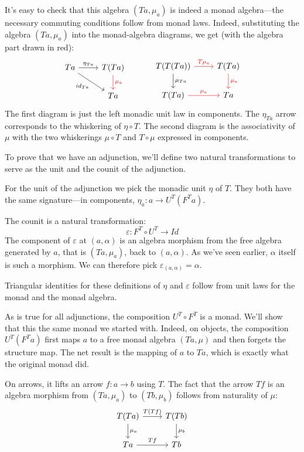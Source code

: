 \documentclass[DaoFP]{subfiles}
\begin{document}
It's easy to check that this algebra $(T a, \mu_a)$ is indeed a monad algebra---the necessary commuting conditions follow from monad laws. Indeed, substituting the algebra $(T a, \mu_a)$ into the monad-algebra diagrams, we get (with the algebra part drawn in red):
\[
 \begin{tikzcd}
 T a
 \arrow[r, "\eta_{T a}"]
 \arrow[dr, "id_{T a}"']
 & T(T a)
 \arrow[d, red, "\mu_a"]
 \\
 & T a
 \end{tikzcd}
  \hspace{30pt}
 \begin{tikzcd}
T(T(T a))
\arrow[r, red, "T \mu_a "]
\arrow[d, "\mu_{T a}"]
&T(T a)
\arrow[d, red, "\mu_a"]
\\
T (T a)
\arrow[r, red, "\mu_a"]
& T a
 \end{tikzcd}
\]
The first diagram is just the left monadic unit law in components. The $\eta_{T a}$ arrow corresponds to the whiskering of $\eta \circ T$. The second diagram is the associativity of $\mu$ with the two whiskerings $\mu \circ T$ and $T \circ \mu$ expressed in components.


To prove that we have an adjunction, we'll define two natural transformations to serve as the unit and the counit of the adjunction. 

For the unit of the adjunction we pick the monadic unit $\eta$ of $T$. They both have the same signature---in components, $\eta_a \colon a \to U^T (F^T a)$.

The counit is a natural transformation:
\[ \varepsilon \colon F^T \circ U^T \to Id \]
The component of $\varepsilon$ at $(a, \alpha)$ is an algebra morphism from the free algebra generated by $a$, that is $(T a, \mu_a)$, back to $(a, \alpha)$. As we've seen earlier, $\alpha$ itself is such a morphism. We can therefore pick $\varepsilon_{(a, \alpha)} = \alpha$.

Triangular identities for these definitions of $\eta$ and $\varepsilon$ follow from unit laws for the monad and the monad algebra.


As is true for all adjunctions, the composition $U^T \circ F^T$ is a monad. We'll show that this the same monad we started with. Indeed, on objects, the composition $U^T (F^T a)$ first maps $a$ to a free monad algebra $(T a, \mu)$ and then forgets the structure map. The net result is the mapping of $a$ to $T a$, which is exactly what the original monad did. 

On arrows, it lifts an arrow $f \colon a \to b$ using $T$. The fact that the arrow $T f$ is an algebra morphism from $(T a, \mu_a)$ to $(T b, \mu_b)$ follows from naturality of $\mu$:
\[
 \begin{tikzcd}
 T (T a)
 \arrow[r, "T( T f)"]
 \arrow[d, "\mu_a"]
 & T (T b)
\arrow[d, "\mu_b"]
 \\
 T a
 \arrow[r, "T f"]
 & T b
  \end{tikzcd}
\]
\end{document}
